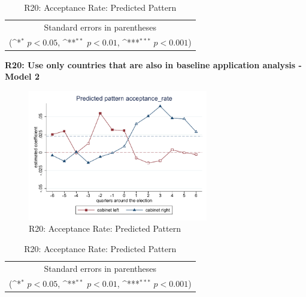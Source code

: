 \documentclass[10pt,a4paper]{scrartcl}
\begin{document}
\begin{table}[!ht]\centering
	\renewcommand{\arraystretch}{1.25}
	\def\sym#1{\ifmmode^{#1}\else\(^{#1}\)\fi}
	\caption{R20: Acceptance Rate: Predicted Pattern}
	\begin{tabular}{l*{2}{c}}
		\hline\hline
		
		\hline\hline
		\multicolumn{3}{c}{\footnotesize Standard errors in parentheses} \\
		\multicolumn{3}{c}{\footnotesize (\sym{*} \(p<0.05\), \sym{**} \(p<0.01\), \sym{***} \(p<0.001\))}\\
	\end{tabular}
\end{table}

\clearpage
\textbf{R20: Use only countries that are also in baseline application analysis - Model 2}
\begin{figure}[!ht]
	\centering
	\includegraphics[width=0.7\textwidth]{figures_edited/acceptance_rate_graph2_R20.pdf}
	\caption{R20: Acceptance Rate: Predicted Pattern}
\end{figure}

\begin{table}[!ht]\centering
	\footnotesize
	\renewcommand{\arraystretch}{1.2}
	\def\sym#1{\ifmmode^{#1}\else\(^{#1}\)\fi}
	\caption{R20: Acceptance Rate: Predicted Pattern}
	\begin{tabular}{l*{2}{c}}
		\hline\hline
		
		\hline\hline
		\multicolumn{3}{c}{\footnotesize Standard errors in parentheses} \\
		\multicolumn{3}{c}{\footnotesize (\sym{*} \(p<0.05\), \sym{**} \(p<0.01\), \sym{***} \(p<0.001\))} \\
	\end{tabular}
\end{table}
\end{document}
